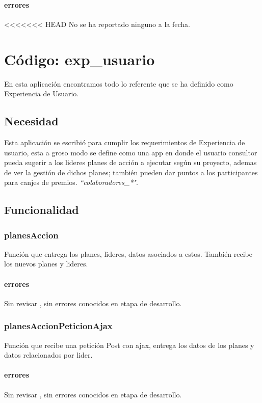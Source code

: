 \documentclass[10pt,a4paper]{book}
\begin{document}
	\subsubsection{errores}
<<<<<<< HEAD
	No se ha reportado ninguno a la fecha.


	\chapter{Código: exp_usuario}

	En esta aplicación encontramos todo lo referente que se ha definido como Experiencia de Usuario.

	\section{Necesidad}

	Esta aplicación se escribió para cumplir los requerimientos de Experiencia de usuario, esta a groso modo se define como una app en donde el usuario consultor pueda sugerir a los lideres planes de acción a ejecutar según su proyecto, ademas de ver la gestión de dichos planes; también pueden dar puntos a los participantes para canjes de premios. \textit{``colaboradores\_*"}.

	\section{Funcionalidad}

	\subsection{planesAccion}
	 Función que entrega los planes, lideres, datos asociados a estos. También recibe los nuevos planes y lideres.

	\subsubsection{errores}
	Sin revisar , sin errores conocidos en etapa de desarrollo.

	\subsection{ planesAccionPeticionAjax}
	 Función  que recibe una petición Post con ajax, entrega los datos de los planes y datos relacionados por lider.

	\subsubsection{errores}
	Sin revisar , sin errores conocidos en etapa de desarrollo.
\end{document}
